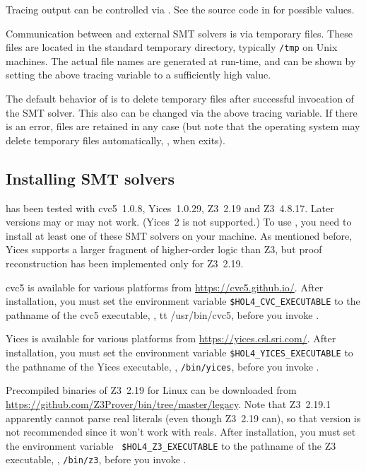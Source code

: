 Tracing output can be controlled via .  See the source code in  for
possible values.

Communication between \HOL{} and external SMT solvers is via temporary
files.  These files are located in the standard temporary directory,
typically {\tt /tmp} on Unix machines.  The actual file names are
generated at run-time, and can be shown by setting the above tracing
variable to a sufficiently high value.

The default behavior of  is to delete temporary files
after successful invocation of the SMT solver.  This also can be
changed via the above tracing variable.  If there is an error, files
are retained in any case (but note that the operating system may
delete temporary files automatically, \eg, when \HOL{} exits).

\subsection{Installing SMT solvers}

 has been tested with cvc5~1.0.8, Yices~1.0.29, Z3~2.19
and Z3~4.8.17. Later versions may or may not work.  (Yices~2 is not
supported.)  To use , you need to install at least one
of these SMT solvers on your machine.  As mentioned before, Yices
supports a larger fragment of higher-order logic than Z3, but proof
reconstruction has been implemented only for Z3~2.19.

cvc5 is available for various platforms from
\url{https://cvc5.github.io/}. After installation, you must set the
environment variable {\tt \$HOL4\_CVC\_EXECUTABLE} to the pathname of
the cvc5 executable, \eg, {tt /usr/bin/cvc5}, before you invoke \HOL.

Yices is available for various platforms from
\url{https://yices.csl.sri.com/}.  After installation, you must set
the environment variable {\tt \$HOL4\_YICES\_EXECUTABLE} to the
pathname of the Yices executable, \eg, {\tt /bin/yices}, before you
invoke \HOL.

Precompiled binaries of Z3~2.19 for Linux can be downloaded from
\url{https://github.com/Z3Prover/bin/tree/master/legacy}. Note that
Z3~2.19.1 apparently cannot parse real literals (even though Z3~2.19
can), so that version is not recommended since it won't work with
reals. After installation, you must set the environment variable {\tt
\$HOL4\_Z3\_EXECUTABLE} to the pathname of the Z3 executable, \eg,
{\tt /bin/z3}, before you invoke \HOL.

